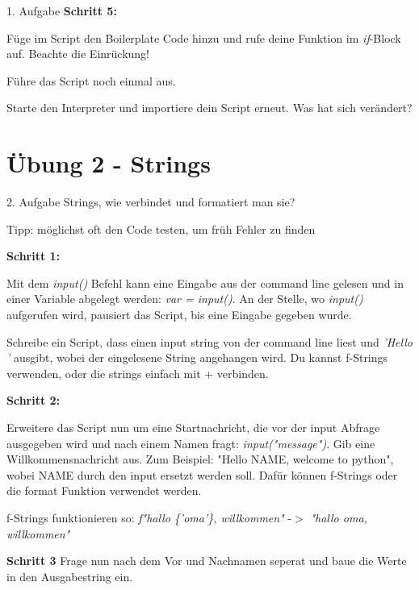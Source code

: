 \begin{frame}{1. Aufgabe}
	\textbf{Schritt 5:}
	
	Füge im Script den Boilerplate Code hinzu und rufe deine Funktion im \textit{if}-Block auf. Beachte die Einrückung!
	
	
	
	Führe das Script noch einmal aus.
	
	Starte den Interpreter und importiere dein Script erneut. Was hat sich verändert?
\end{frame}

\section{Übung 2 - Strings}

\begin{frame}{2. Aufgabe}
	Strings, wie verbindet und formatiert man sie?
	
	Tipp: möglichst oft den Code testen, um früh Fehler zu finden
	
	\textbf{Schritt 1:}
	
	Mit dem \textit{input()} Befehl kann eine Eingabe aus der command line gelesen und in einer Variable abgelegt werden: \textit{var = input()}. An der Stelle, wo \textit{input()} aufgerufen wird, pausiert das Script, bis eine Eingabe gegeben wurde.
	
	Schreibe ein Script, dass einen input string von der command line liest und \textit{'Hello '} ausgibt, wobei der eingelesene String angehangen wird. Du kannst f-Strings verwenden, oder die strings einfach mit + verbinden.
\end{frame}
\begin{frame}
	\textbf{Schritt 2:}
	
	Erweitere das Script nun um eine Startnachricht, die vor der input Abfrage ausgegeben wird und nach einem Namen fragt: \textit{input("message")}. Gib eine Willkommensnachricht aus. Zum Beispiel: "Hello NAME, welcome to python", wobei NAME durch den input ersetzt werden soll. Dafür können f-Strings oder die format Funktion verwendet werden.
	
	f-Strings funktionieren so: \textit{f"hallo \{'oma'\}, willkommen"} -$>$ \textit{"hallo oma, willkommen"}
	\linebreak
	
	\textbf{Schritt 3}	
	Frage nun nach dem Vor und Nachnamen seperat und baue die Werte in den Ausgabestring ein.
\end{frame}


